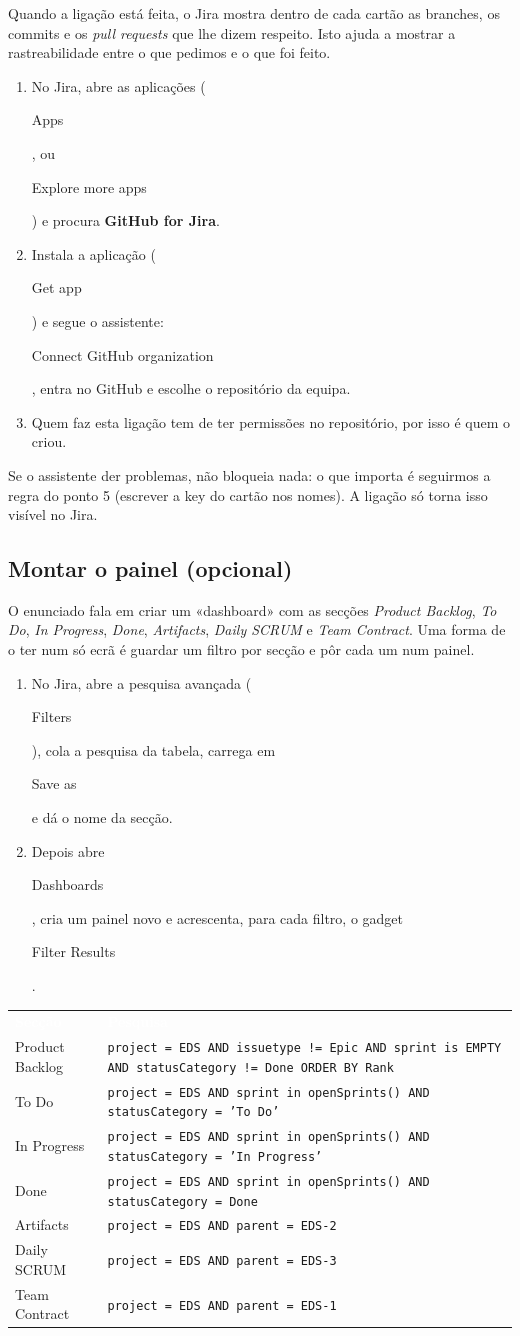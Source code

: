 \documentclass[11pt,a4paper]{article}
\newcommand{\th}[1]{\textcolor{white}{\sffamily\bfseries #1}}
\newcommand{\btn}[1]{{\setlength{\fboxsep}{1.6pt}\colorbox{azulclaro}{\sffamily\small\strut #1}}}
\newcommand{\tabelaini}{\begingroup\small\renewcommand{\arraystretch}{1.45}\rowcolors{2}{azulclaro!55}{white}}
\newcommand{\tabelafim}{\endgroup}
\begin{document}
Quando a ligação está feita, o Jira mostra dentro de cada cartão as branches, os commits e os \textit{pull requests} que lhe dizem respeito. Isto ajuda a mostrar a rastreabilidade entre o que pedimos e o que foi feito.

\begin{enumerate}
  \item No Jira, abre as aplicações (\btn{Apps}, ou \btn{Explore more apps}) e procura \textbf{GitHub for Jira}.
  \item Instala a aplicação (\btn{Get app}) e segue o assistente: \btn{Connect GitHub organization}, entra no GitHub e escolhe o repositório da equipa.
  \item Quem faz esta ligação tem de ter permissões no repositório, por isso é quem o criou.
\end{enumerate}

Se o assistente der problemas, não bloqueia nada: o que importa é seguirmos a regra do ponto 5 (escrever a key do cartão nos nomes). A ligação só torna isso visível no Jira.

\subsection{Montar o painel (opcional)}

O enunciado fala em criar um «dashboard» com as secções \textit{Product Backlog}, \textit{To Do}, \textit{In Progress}, \textit{Done}, \textit{Artifacts}, \textit{Daily SCRUM} e \textit{Team Contract}. Uma forma de o ter num só ecrã é guardar um filtro por secção e pôr cada um num painel.

\begin{enumerate}
  \item No Jira, abre a pesquisa avançada (\btn{Filters}), cola a pesquisa da tabela, carrega em \btn{Save as} e dá o nome da secção.
  \item Depois abre \btn{Dashboards}, cria um painel novo e acrescenta, para cada filtro, o gadget \btn{Filter Results}.
\end{enumerate}

\tabelaini
\begin{tabularx}{\textwidth}{N{3.2cm} Y}
   \th{Secção} & \th{Pesquisa} \\
  Product Backlog & \small\texttt{project = EDS AND issuetype != Epic AND sprint is EMPTY AND statusCategory != Done ORDER BY Rank} \\
  To Do & \small\texttt{project = EDS AND sprint in openSprints() AND statusCategory = 'To Do'} \\
  In Progress & \small\texttt{project = EDS AND sprint in openSprints() AND statusCategory = 'In Progress'} \\
  Done & \small\texttt{project = EDS AND sprint in openSprints() AND statusCategory = Done} \\
  Artifacts & \small\texttt{project = EDS AND parent = EDS-2} \\
  Daily SCRUM & \small\texttt{project = EDS AND parent = EDS-3} \\
  Team Contract & \small\texttt{project = EDS AND parent = EDS-1} \\
  \bottomrule
\end{tabularx}
\tabelafim
\end{document}
